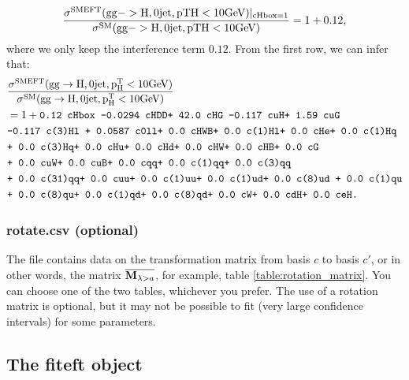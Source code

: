 \documentclass[12pt]{article}
\def\b#1{\boldsymbol{\rm #1}}
\newcommand{\SM}{\text{SM}}
\begin{document}
 \begin{align}
   \rm \frac{\sigma^{SMEFT}(gg->H,0jet,pTH<10GeV)|_{cHbox=1}}{\sigma^\SM(gg->H,0jet,pTH<10GeV)}= 1+0.12,
 \end{align}
 where we only keep the interference term $0.12$. From the first row, we can infer that:
 \begin{align}
   &\rm \frac{\sigma^{SMEFT}(gg\to H,0jet,p^T_H<10GeV)}{\sigma^\SM(gg\to H,0jet,p^T_H<10GeV)} \nonumber \\ \nonumber&= 1+ \texttt{0.12 cHbox -0.0294 cHDD+ 42.0 cHG -0.117 cuH+ 1.59 cuG}\\ \nonumber
   &\texttt{-0.117 c(3)Hl + 0.0587 c0ll+ 0.0 cHWB+ 0.0 c(1)Hl+ 0.0 cHe+ 0.0 c(1)Hq}\\ \nonumber
   &\texttt{+ 0.0 c(3)Hq+ 0.0 cHu+ 0.0 cHd+ 0.0 cHW+ 0.0 cHB+ 0.0 cG}\\ \nonumber
   &\texttt{+ 0.0 cuW+ 0.0 cuB+ 0.0 cqq+ 0.0 c(1)qq+ 0.0 c(3)qq}\\ \nonumber&
   \texttt{+ 0.0 c(31)qq+ 0.0 cuu+ 0.0 c(1)uu+ 0.0 c(1)ud+ 0.0 c(8)ud + 0.0 c(1)qu}\\ \nonumber
   &\texttt{+ 0.0 c(8)qu+ 0.0 c(1)qd+ 0.0 c(8)qd+ 0.0 cW+ 0.0 cdH+ 0.0 ceH.}
 \end{align}
 \subsubsection{rotate.csv (optional)}
 The file contains data on the transformation matrix from basis $c$ to basis $c'$, or in other words, the matrix $\overline{\b M_{\lambda >a}}$, for example, table \ref{table:rotation_matrix}. You can choose one of the two tables, whichever you prefer. The use of a rotation matrix is optional, but it may not be possible to fit (very large confidence intervals) for some parameters.
 \clearpage
 \subsection{The fiteft object}
\end{document}
